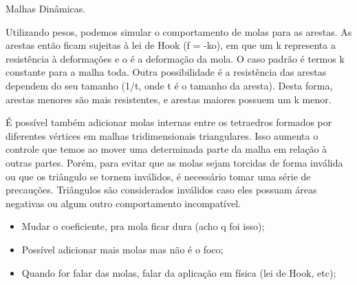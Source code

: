 
Malhas Dinâmicas\cite{soares2007}.

Utilizando pesos, podemos simular o comportamento de molas para as arestas.
As arestas então ficam sujeitas à lei de Hook (f = -ko), em que um k representa a resistência à deformações e o é a deformação da mola.
O caso padrão é termos k constante para a malha toda.
Outra possibilidade é a resistência das arestas dependem do seu tamanho (1/t, onde t é o tamanho da aresta). Desta forma, arestas menores são mais resistentes, e arestas maiores possuem um k menor.

É possível também adicionar molas internas entre os tetraedros formados por diferentes vértices em malhas tridimensionais triangulares. 
Isso aumenta o controle que temos ao mover uma determinada parte da malha em relação à outras partes.
Porém, para evitar que as molas sejam torcidas de forma inválida ou que os triângulo se tornem inválidos, é necessário tomar uma série de precauções.
Triângulos são considerados inválidos caso eles possuam áreas negativas ou algum outro comportamento incompatível.


\begin{itemize}
    \item Mudar o coeficiente, pra mola ficar dura (acho q foi isso);
    \item Possível adicionar mais molas mas não é o foco;
    \item Quando for falar das molas, falar da aplicação em física (lei de Hook, etc);
\end{itemize}